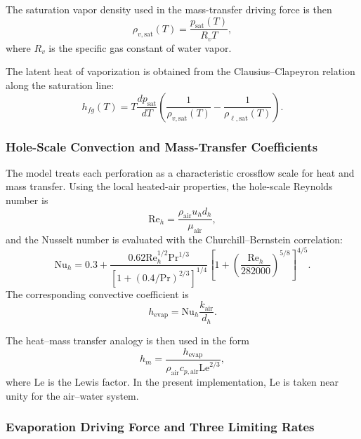 \documentclass{article}
\begin{document}
The saturation vapor density used in the mass-transfer driving force is then
\begin{equation}
\rho_{v,\mathrm{sat}}(T) = \frac{p_{\mathrm{sat}}(T)}{R_v T},
\end{equation}
where $R_v$ is the specific gas constant of water vapor.

The latent heat of vaporization is obtained from the Clausius--Clapeyron
relation along the saturation line:
\begin{equation}
h_{fg}(T)
= T \frac{dp_{\mathrm{sat}}}{dT}
\left(\frac{1}{\rho_{v,\mathrm{sat}}(T)} -
\frac{1}{\rho_{\ell,\mathrm{sat}}(T)}\right).
\end{equation}

\subsubsection{Hole-Scale Convection and Mass-Transfer Coefficients}

The model treats each perforation as a characteristic crossflow scale for
heat and mass transfer. Using the local heated-air properties, the hole-scale
Reynolds number is
\begin{equation}
\mathrm{Re}_h
= \frac{\rho_{\mathrm{air}} u_h d_h}{\mu_{\mathrm{air}}},
\end{equation}
and the Nusselt number is evaluated with the Churchill--Bernstein correlation:
\begin{equation}
\mathrm{Nu}_h
= 0.3 +
\frac{0.62 \mathrm{Re}_h^{1/2} \mathrm{Pr}^{1/3}}
{\left[1 + (0.4/\mathrm{Pr})^{2/3}\right]^{1/4}}
\left[1 + \left(\frac{\mathrm{Re}_h}{282000}\right)^{5/8}\right]^{4/5}.
\end{equation}
The corresponding convective coefficient is
\begin{equation}
h_{\mathrm{evap}}
= \mathrm{Nu}_h \frac{k_{\mathrm{air}}}{d_h}.
\end{equation}

The heat--mass transfer analogy is then used in the form
\begin{equation}
h_m
= \frac{h_{\mathrm{evap}}}
{\rho_{\mathrm{air}} c_{p,\mathrm{air}} \mathrm{Le}^{2/3}},
\end{equation}
where $\mathrm{Le}$ is the Lewis factor. In the present implementation,
$\mathrm{Le}$ is taken near unity for the air--water system.

\subsubsection{Evaporation Driving Force and Three Limiting Rates}
\end{document}
